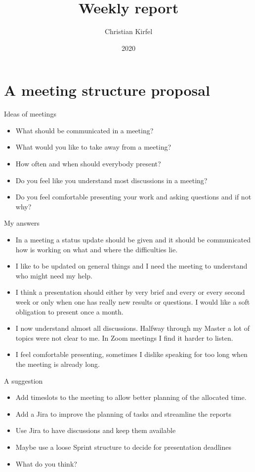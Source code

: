 \documentclass{beamer}
\title{Weekly report}
\author{Christian Kirfel}
\institute{Physikalisches Institut Bonn}
\date{2020}
\begin{document}
\frame{\titlepage}

\section{A meeting structure proposal}

\begin{frame}{Ideas of meetings}
    \begin{itemize}
        \item What should be communicated in a meeting?
        \item What would you like to take away from a meeting?
        \item How often and when should everybody present?
        \item Do you feel like you understand most discussions in a meeting?
        \item Do you feel comfortable presenting your work and asking questions and if not why?
    \end{itemize}
\end{frame}

\begin{frame}{My answers}
    \begin{itemize}
        \item In a meeting a status update should be given and it should be communicated how is working on what and where the difficulties lie.
        \item I like to be updated on general things and I need the meeting to understand who might need my help.
        \item I think a presentation should either by very brief and every or every second week or only when one has really new results or questions. I would like a soft obligation to present once a month.
        \item I now understand almost all discussions. Halfway through my Master a lot of topics were not clear to me. In Zoom meetings I find it harder to listen.
        \item I feel comfortable presenting, sometimes I dislike speaking for too long when the meeting is already long.
    \end{itemize}
\end{frame}

\begin{frame}{A suggestion}
    \begin{itemize}
        \item Add timeslots to the meeting to allow better planning of the allocated time.
        \item Add a Jira to improve the planning of tasks and streamline the reports
        \item Use Jira to have discussions and keep them available
        \item Maybe use a loose Sprint structure to decide for presentation deadlines
        \item What do you think?
    \end{itemize}
\end{frame}
\end{document}
